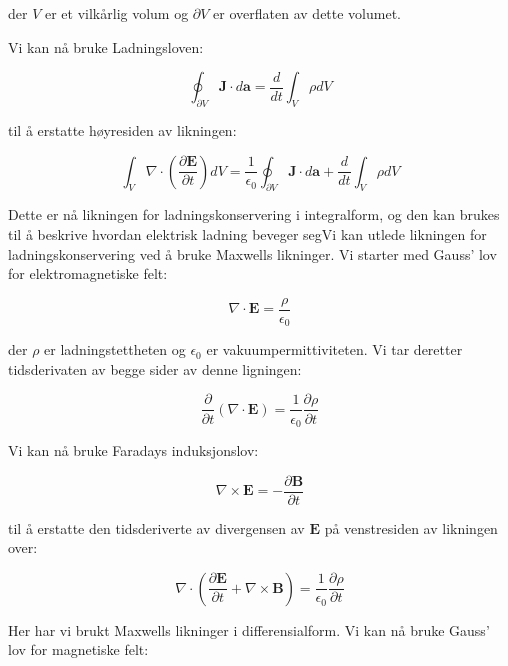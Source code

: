 der $V$ er et vilkårlig volum og $\partial V$ er overflaten av dette volumet.

Vi kan nå bruke Ladningsloven:

\begin{equation*}
\oint_{\partial V} \mathbf{J} \cdot d\mathbf{a} = \frac{d}{dt} \int_V \rho dV
\end{equation*}

til å erstatte høyresiden av likningen:

\begin{equation*}
\int_V \nabla \cdot (\frac{\partial \mathbf{E}}{\partial t}) dV = \frac{1}{\epsilon_0} \oint_{\partial V} \mathbf{J} \cdot d\mathbf{a} + \frac{d}{dt} \int_V \rho dV
\end{equation*}

Dette er nå likningen for ladningskonservering i integralform, og den kan brukes til å beskrive hvordan elektrisk ladning beveger segVi kan utlede likningen for ladningskonservering ved å bruke Maxwells likninger. Vi starter med Gauss' lov for elektromagnetiske felt:

\begin{equation*}
\nabla \cdot \mathbf{E} = \frac{\rho}{\epsilon_0}
\end{equation*}

der $\rho$ er ladningstettheten og $\epsilon_0$ er vakuumpermittiviteten. Vi tar deretter tidsderivaten av begge sider av denne ligningen:

\begin{equation*}
\frac{\partial}{\partial t}(\nabla \cdot \mathbf{E}) = \frac{1}{\epsilon_0}\frac{\partial \rho}{\partial t}
\end{equation*}

Vi kan nå bruke Faradays induksjonslov:

\begin{equation*}
\nabla \times \mathbf{E} = -\frac{\partial \mathbf{B}}{\partial t}
\end{equation*}

til å erstatte den tidsderiverte av divergensen av $\mathbf{E}$ på venstresiden av likningen over:

\begin{equation*}
\nabla \cdot (\frac{\partial \mathbf{E}}{\partial t} + \nabla \times \mathbf{B}) = \frac{1}{\epsilon_0}\frac{\partial \rho}{\partial t}
\end{equation*}

Her har vi brukt Maxwells likninger i differensialform. Vi kan nå bruke Gauss' lov for magnetiske felt:

